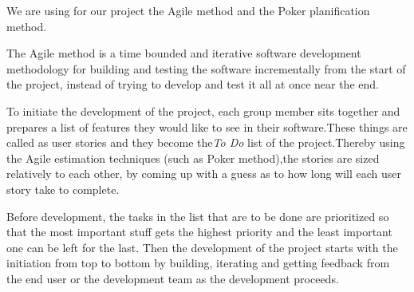 We are using for our project the Agile method and the Poker planification method.

The Agile method is a time bounded and iterative software development methodology for building and testing the software incrementally from the start of the project, instead of trying to develop and test it all at once near the end.

To initiate the development of the project, each group member sits together and prepares a list of features they would like to see in their software.These things are called as user stories and they become the\emph{To Do} list of the project.Thereby using the Agile estimation techniques (such as Poker method),the stories are sized relatively to each other, by coming up with a guess as to how long will each user story take to complete. 

Before development, the tasks in the list that are to be done are prioritized  so that the most important stuff gets the highest priority and the least important one can be left for the last.
Then the development of the project starts with the initiation from top to bottom by building, iterating and getting feedback from the end user or the development team as the development proceeds.